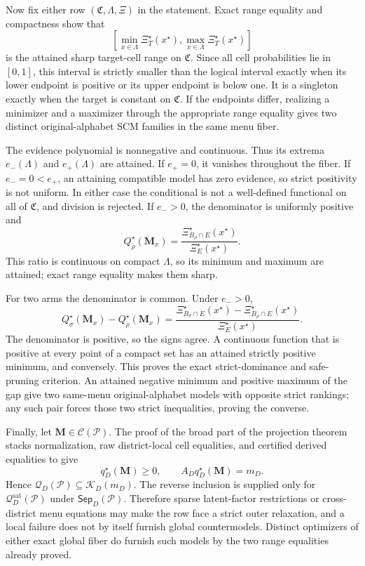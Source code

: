 Now fix either row \((\mathfrak C,\Lambda,\Xi)\) in the statement.  Exact range equality and compactness show that
\[
\left[
\min_{x\in\Lambda}\Xi_T^\star(x^\star),
\max_{x\in\Lambda}\Xi_T^\star(x^\star)
\right]
\]
is the attained sharp target-cell range on \(\mathfrak C\).  Since all cell probabilities lie in \([0,1]\), this interval is strictly smaller than the logical interval exactly when its lower endpoint is positive or its upper endpoint is below one.  It is a singleton exactly when the target is constant on \(\mathfrak C\).  If the endpoints differ, realizing a minimizer and a maximizer through the appropriate range equality gives two distinct original-alphabet SCM families in the same menu fiber.

The evidence polynomial is nonnegative and continuous.  Thus its extrema \(e_-(\Lambda)\) and \(e_+(\Lambda)\) are attained.  If \(e_+=0\), it vanishes throughout the fiber.  If \(e_-=0<e_+\), an attaining compatible model has zero evidence, so strict positivity is not uniform.  In either case the conditional is not a well-defined functional on all of \(\mathfrak C\), and division is rejected.  If \(e_->0\), the denominator is uniformly positive and
\[
Q_\rho^\star(\mathbf M_x)
=\frac{\Xi_{B_\rho\cap E}^\star(x^\star)}
       {\Xi_E^\star(x^\star)}.
\]
This ratio is continuous on compact \(\Lambda\), so its minimum and maximum are attained; exact range equality makes them sharp.

For two arms the denominator is common.  Under \(e_->0\),
\[
Q_\sigma^\star(\mathbf M_x)-Q_\rho^\star(\mathbf M_x)
=\frac{\Xi_{B_\sigma\cap E}^\star(x^\star)
-\Xi_{B_\rho\cap E}^\star(x^\star)}
{\Xi_E^\star(x^\star)}.
\]
The denominator is positive, so the signs agree.  A continuous function that is positive at every point of a compact set has an attained strictly positive minimum, and conversely.  This proves the exact strict-dominance and safe-pruning criterion.  An attained negative minimum and positive maximum of the gap give two same-menu original-alphabet models with opposite strict rankings; any such pair forces those two strict inequalities, proving the converse.

Finally, let \(\mathbf M\in\mathcal C(\mathcal P)\).  The proof of the broad part of the projection theorem stacks normalization, raw district-local cell equalities, and certified derived equalities to give
\[
q_D^\star(\mathbf M)\geq0,
\qquad A_Dq_D^\star(\mathbf M)=m_D.
\]
Hence \(\mathcal Q_D(\mathcal P)\subseteq\mathcal K_D(m_D)\).  The reverse inclusion is supplied only for \(\mathcal Q_D^{\mathrm{sat}}(\mathcal P)\) under \(\mathsf{Sep}_D(\mathcal P)\).  Therefore sparse latent-factor restrictions or cross-district menu equations may make the row face a strict outer relaxation, and a local failure does not by itself furnish global countermodels.  Distinct optimizers of either exact global fiber do furnish such models by the two range equalities already proved.
